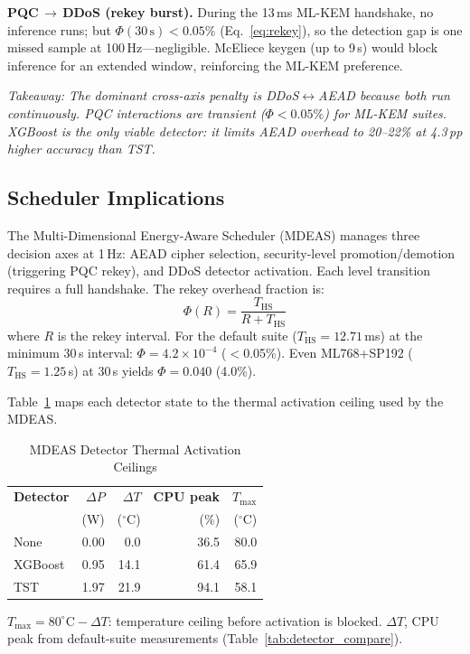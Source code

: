 \textbf{PQC\,$\to$\,DDoS (rekey burst).}\quad
During the 13\,ms ML-KEM handshake, no inference runs; but
$\Phi(30\,\text{s}) < 0.05\%$ (Eq.~\ref{eq:rekey}), so the
detection gap is one missed sample at 100\,Hz---negligible.
McEliece keygen (up to 9\,s) would block inference for an
extended window, reinforcing the ML-KEM preference.

\emph{Takeaway: The dominant cross-axis penalty is
DDoS$\leftrightarrow$AEAD because both run continuously.
PQC interactions are transient ($\Phi < 0.05\%$) for ML-KEM
suites.  XGBoost is the only viable detector: it limits AEAD
overhead to 20--22\% at 4.3\,pp higher accuracy than TST.}

\subsection{Scheduler Implications}
\label{sec:scheduler}

The Multi-Dimensional Energy-Aware Scheduler (MDEAS) manages three
decision axes at 1\,Hz: AEAD cipher selection, security-level
promotion/demotion (triggering PQC rekey), and DDoS detector
activation.  Each level transition requires a full handshake.
The rekey overhead fraction is:
\begin{equation}
\Phi(R) = \frac{T_\text{HS}}{R + T_\text{HS}}
\label{eq:rekey}
\end{equation}
where $R$ is the rekey interval.  For the default suite
($T_\text{HS} = 12.71$\,ms) at the minimum 30\,s interval:
$\Phi = 4.2 \times 10^{-4}$ ($<$0.05\%).  Even ML768+SP192
($T_\text{HS} = 1.25$\,s) at 30\,s yields $\Phi = 0.040$
(4.0\%).

Table~\ref{tab:detector_overhead} maps each detector state to the
thermal activation ceiling used by the MDEAS.

\begin{table}[t]
\centering
\caption{MDEAS Detector Thermal Activation Ceilings}
\label{tab:detector_overhead}
\footnotesize
\begin{tabular}{@{}lrrrr@{}}
\toprule
\textbf{Detector} &
  \textbf{$\Delta P$} & \textbf{$\Delta T$} &
  \textbf{CPU peak} & \textbf{$T_\text{max}$} \\
& (W) & ($^\circ$C) & (\%) & ($^\circ$C) \\
\midrule
None    & 0.00 & 0.0  & 36.5  & 80.0 \\
XGBoost & 0.95 & 14.1 & 61.4  & 65.9 \\
TST     & 1.97 & 21.9 & 94.1  & 58.1 \\
\bottomrule
\end{tabular}
\begin{tablenotes}
\footnotesize
\item $T_\text{max} = 80^\circ\text{C} - \Delta T$: temperature
  ceiling before activation is blocked.
  $\Delta T$, CPU peak from default-suite measurements
  (Table~\ref{tab:detector_compare}).
\end{tablenotes}
\end{table}


